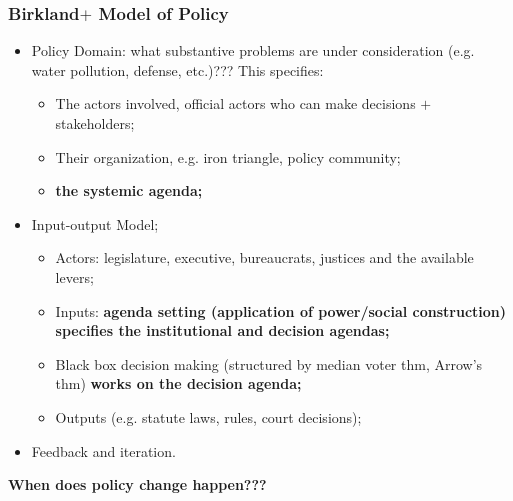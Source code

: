 \documentclass[aspectratio=169]{beamer}
\theoremstyle{principle}
\begin{document}
\begin{frame}
\frametitle{Birkland$+$ Model of Policy}
\begin{itemize}
\item Policy Domain: what substantive problems are under consideration (e.g. water pollution, defense, etc.)???  This specifies:
\begin{itemize}
\item The actors involved, official actors who can make decisions $+$ stakeholders; 
\item Their organization, e.g. iron triangle, policy community;
\item \textbf{the systemic agenda;}
\end{itemize}
\bigskip
\item \color{black}Input-output Model;
\begin{itemize}
\item Actors: legislature, executive, bureaucrats, justices and the available levers;
\item Inputs: \textbf{agenda setting (application of power/social construction) specifies the institutional and decision agendas;}
\item Black box decision making (structured by median voter thm, Arrow's thm) \textbf{works on the decision agenda;}
\item Outputs (e.g. statute laws, rules, court decisions);
\end{itemize}
\bigskip
\item Feedback and iteration.
\end{itemize}
\end{frame}

\begin{frame}
\begin{center}
\Huge \textbf{When does policy change happen???}
\end{center}
\end{frame}
\end{document}
